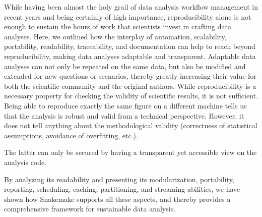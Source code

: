 \documentclass[parskip=half]{scrartcl}
\begin{document}
While having been almost the holy grail of data analysis workflow management in recent years and being certainly of high importance, reproducibility alone is not enough to sustain the hours of work that scientists invest in crafting data analyses.
Here, we outlined how the interplay of automation, scalability, portability, readability, traceability, and documentation can help to reach beyond reproducibility, making data analyses adaptable and transparent.
Adaptable data analyses can not only be repeated on the same data, but also be modified and extended for new questions or scenarios, thereby greatly increasing their value for both the scientific community and the original authors.
While reproducibility is a necessary property for checking the validity of scientific results, it is not sufficient.
Being able to reproduce exactly the same figure on a different machine tells us that the analysis is robust and valid from a technical perspective.
However, it does not tell anything about the methodological validity (correctness of statistical assumptions, avoidance of overfitting, etc.).

The latter can only be secured by having a transparent yet accessible view on the analysis code.

By analyzing its readability and presenting its modularization, portability, reporting, scheduling, caching, partitioning, and streaming abilities, we have shown how Snakemake supports all these aspects, and thereby provides a comprehensive framework for sustainable data analysis.
\end{document}
